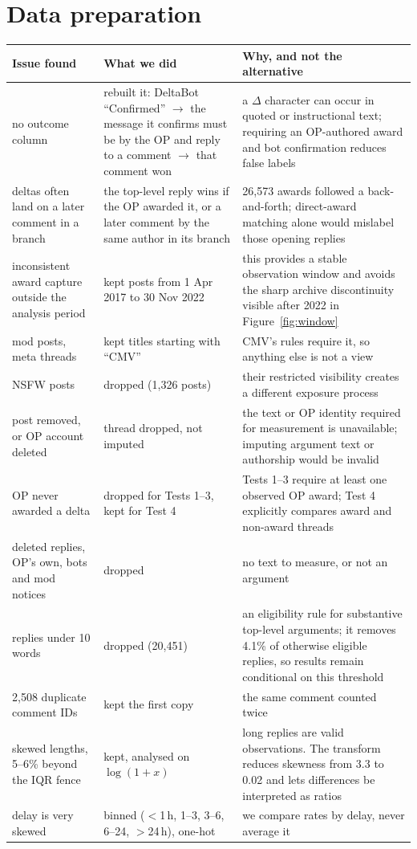 \documentclass[10pt,a4paper,twocolumn]{article}
\begin{document}
\section{Data preparation}

{\footnotesize
\begin{tabularx}{\linewidth}{@{}L{1.85cm} L{2.35cm} Y@{}}
\toprule
\textbf{Issue found} & \textbf{What we did} & \textbf{Why, and not the alternative} \\
\midrule
no outcome column
 & rebuilt it: DeltaBot ``Confirmed'' $\rightarrow$ the message it confirms must be by the OP and reply to a comment $\rightarrow$ that comment won
 & a $\Delta$ character can occur in quoted or instructional text; requiring an OP-authored award and bot confirmation reduces false labels \\
deltas often land on a later comment in a branch
 & the top-level reply wins if the OP awarded it, or a later comment by the same author in its branch
 & 26{,}573 awards followed a back-and-forth; direct-award matching alone would mislabel those opening replies \\
inconsistent award capture outside the analysis period
 & kept posts from 1 Apr 2017 to 30 Nov 2022
 & this provides a stable observation window and avoids the sharp archive discontinuity visible after 2022 in Figure~\ref{fig:window} \\
mod posts, meta threads
 & kept titles starting with ``CMV''
 & CMV's rules require it, so anything else is not a view \\
NSFW posts
 & dropped (1{,}326 posts)
 & their restricted visibility creates a different exposure process \\
post removed, or OP account deleted
 & thread dropped, not imputed
 & the text or OP identity required for measurement is unavailable; imputing argument text or authorship would be invalid \\
OP never awarded a delta
 & dropped for Tests 1--3, kept for Test 4
 & Tests 1--3 require at least one observed OP award; Test 4 explicitly compares award and non-award threads \\
deleted replies, OP's own, bots and mod notices
 & dropped
 & no text to measure, or not an argument \\
replies under 10 words
 & dropped (20{,}451)
 & an eligibility rule for substantive top-level arguments; it removes 4.1\% of otherwise eligible replies, so results remain conditional on this threshold \\
2{,}508 duplicate comment IDs
 & kept the first copy
 & the same comment counted twice \\
skewed lengths, 5--6\% beyond the IQR fence
 & kept, analysed on $\log(1+x)$
 & long replies are valid observations. The transform reduces skewness from 3.3 to 0.02 and lets differences be interpreted as ratios \\
delay is very skewed
 & binned ($<$1\,h, 1--3, 3--6, 6--24, $>$24\,h), one-hot
 & we compare rates by delay, never average it \\
\bottomrule
\end{tabularx}}
\end{document}
